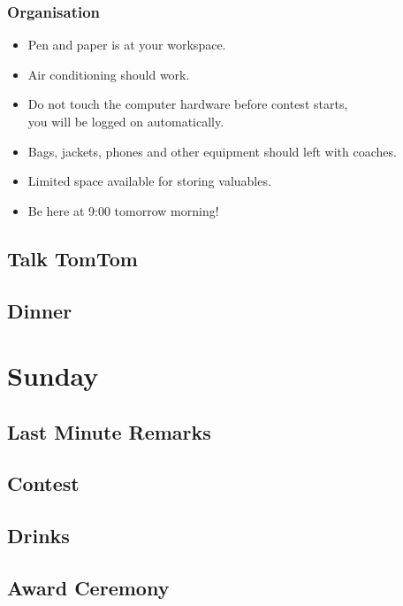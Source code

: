 \documentclass[t]{beamer}
\begin{document}
\begin{frame}
    \frametitle{Organisation}
    \begin{itemize}
        \item Pen and paper is at your workspace.
        \item Air conditioning should work.
        \item Do not touch the computer hardware before contest starts,\\
        	you will be logged on automatically.
        \item Bags, jackets, phones and other equipment should left with coaches.
        \item Limited space available for storing valuables.
        \item Be here at 9:00 tomorrow morning!
     \end{itemize}
\end{frame}

\QuestionsFrame
\subsection{Talk TomTom}
\subsection{Dinner}
\section{Sunday}
\subsection{Last Minute Remarks}
\subsection{Contest}
\subsection{Drinks}
\subsection{Award Ceremony}
\QuestionsFrame
\end{document}
